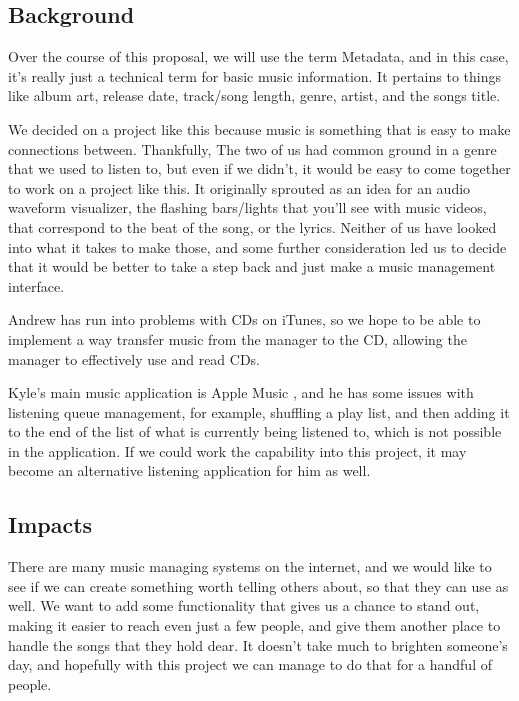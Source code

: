 \documentclass[10pt,conference,onecolumn,compsoc]{IEEEtran}
\begin{document}
\subsection{Background}
Over the course of this proposal, we will use the term Metadata, and in this case, it's really just a technical term for basic music information. It pertains to things like album art, release date, track/song length, genre, artist, and the songs title.

We decided on a project like this because music is something that is easy to make connections between. Thankfully, The two of us had common ground in a genre that we used to listen to, but even if we didn't, it would be easy to come together to work on a project like this. It originally sprouted as an idea for an audio waveform visualizer, the flashing bars/lights that you'll see with music videos, that correspond to the beat of the song, or the lyrics. Neither of us have looked into what it takes to make those, and some further consideration led us to decide that it would be better to take a step back and just make a music management interface.

Andrew has run into problems with CDs on iTunes, so we hope to be able to implement a way transfer music from the manager to the CD, allowing the manager to effectively use and read CDs.

Kyle's main music application is Apple Music , and he has some issues with listening queue management, for example, shuffling a play list, and then adding it to the end of the list of what is currently being listened to, which is not possible in the application. If we could work the capability into this project, it may become an alternative listening application for him as well.

\subsection{Impacts}
There are many music managing systems on the internet, and we would like to see if we can create something worth telling others about, so that they can use as well. We want to add some functionality that gives us a chance to stand out, making it easier to reach even just a few people, and give them another place to handle the songs that they hold dear. It doesn't take much to brighten someone's day, and hopefully with this project we can manage to do that for a handful of people.
\end{document}
